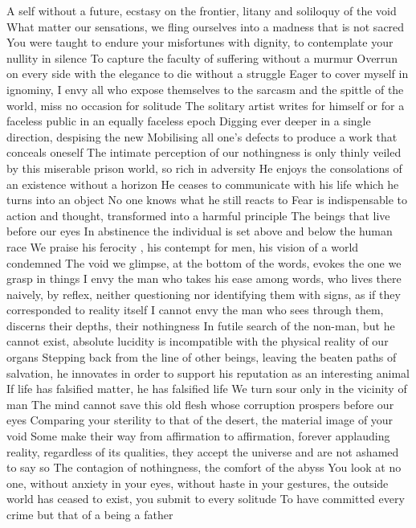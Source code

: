 \documentclass{article}
\begin{document}
A self without a future, ecstasy on the frontier, litany and soliloquy of the void
What matter our sensations, we fling ourselves into a madness that is not sacred
You were taught to endure your misfortunes with dignity, to contemplate your nullity in silence
To capture the faculty of suffering without a murmur
Overrun on every side with the elegance to die without a struggle
Eager to cover myself in ignominy, I envy all who expose themselves to the sarcasm and the spittle of the world, miss no occasion for solitude
The solitary artist writes for himself or for a faceless public in an equally faceless epoch
Digging ever deeper in a single direction, despising the new
Mobilising all one's defects to produce a work that conceals oneself
The intimate perception of our nothingness is only thinly veiled by this miserable prison world, so rich in adversity
He enjoys the consolations of an existence without a horizon
He ceases to communicate with his life which he turns into an object
No one knows what he still reacts to
Fear is indispensable  to action and thought, transformed into a harmful principle
The beings that live before our eyes
In abstinence the individual is set above and below the human race
We praise his ferocity , his contempt for men, his vision of a world condemned
The void we glimpse, at the bottom of the words, evokes the one we grasp in things
I envy the man who takes his ease among words, who lives there naively, by reflex, neither questioning nor identifying them with signs, as if they corresponded to reality itself
I cannot envy the man who sees through them, discerns their depths, their nothingness
In futile search of the non-man, but he cannot exist, absolute lucidity is incompatible with the physical reality of our organs
Stepping back from the line of other beings, leaving the beaten paths of salvation, he innovates in order to support his reputation as an interesting animal
If life has falsified matter, he has falsified life
We turn sour only in the vicinity of man
The mind cannot save this old flesh whose corruption prospers before our eyes
Comparing your sterility to that of the desert, the material image of your void
Some make their way from affirmation to affirmation, forever applauding reality, regardless of its qualities, they accept the universe and are not ashamed to say so
The contagion of nothingness, the comfort of the abyss
You look at no one, without anxiety in your eyes, without haste in your gestures, the outside world has ceased to exist, you submit to every solitude
To have committed every crime but that of a being a father
\end{document}
